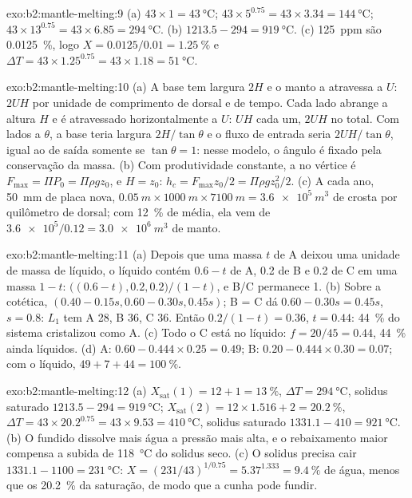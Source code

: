 \begin{solution}{exo:b2:mantle-melting:9}
(a) $43\times1 = \qty{43}{\celsius}$; $43\times5^{0.75} = 43\times3.34 =
\qty{144}{\celsius}$; $43\times13^{0.75} = 43\times6.85 = \qty{294}{\celsius}$.
(b) $1213.5 - 294 = \qty{919}{\celsius}$. (c) \qty{125}{ppm} são
\qty{0.0125}{\percent}, logo $X = 0.0125/0.01 = \qty{1.25}{\percent}$ e $\Delta T =
43\times1.25^{0.75} = 43\times1.18 = \qty{51}{\celsius}$.
\end{solution}

\begin{solution}{exo:b2:mantle-melting:10}
(a) A base tem largura $2H$ e o manto a atravessa a $U$: $2UH$ por unidade de comprimento
de dorsal e de tempo. Cada lado abrange a altura $H$ e é atravessado horizontalmente a
$U$: $UH$ cada um, $2UH$ no total. Com lados a $\theta$, a base teria largura
$2H/\tan\theta$ e o fluxo de entrada seria $2UH/\tan\theta$, igual ao de saída somente se
$\tan\theta = 1$: nesse modelo, o ângulo é fixado pela conservação da massa. (b) Com
produtividade constante, a  no vértice é $F_{\max} = \Pi P_0 = \Pi\rho
g z_0$, e $H = z_0$: $h_c = F_{\max}z_0/2 = \Pi\rho g z_0^2/2$. (c) A cada ano,
\qty{50}{mm} de placa nova, $\qty{0.05}{m}\times\qty{1000}{m}\times\qty{7100}{m} =
\qty{3.6e5}{m^3}$ de crosta por quilômetro de dorsal; com \qty{12}{\percent} de  média, ela vem de $\num{3.6e5}/0.12 = \qty{3.0e6}{m^3}$ de manto.
\end{solution}

\begin{solution}{exo:b2:mantle-melting:11}
(a) Depois que uma massa $t$ de A deixou uma unidade de massa de líquido, o líquido contém $0.6 -
t$ de A, 0.2 de B e 0.2 de C em uma massa $1 - t$: $\big((0.6 - t), 0.2,
0.2\big)/(1 - t)$, e B/C permanece 1. (b) Sobre a cotética, $(0.40 - 0.15s, 0.60 -
0.30s, 0.45s)$; B = C dá $0.60 - 0.30s = 0.45s$, $s = 0.8$: $L_1$ tem A 28, B
36, C 36. Então $0.2/(1 - t) = 0.36$, $t = 0.44$: \qty{44}{\percent} do sistema
cristalizou como A. (c) Todo o C está no líquido: $f = 20/45 = 0.44$,
\qty{44}{\percent} ainda líquidos. (d) A: $0.60 - 0.444\times0.25 = 0.49$; B: $0.20 -
0.444\times0.30 = 0.07$; com o líquido, $49 + 7 + 44 = \qty{100}{\percent}$.
\end{solution}

\begin{solution}{exo:b2:mantle-melting:12}
(a) $X_{\mathrm{sat}}(1) = 12 + 1 = \qty{13}{\percent}$, $\Delta T =
\qty{294}{\celsius}$, solidus saturado $1213.5 - 294 = \qty{919}{\celsius}$;
$X_{\mathrm{sat}}(2) = 12\times1.516 + 2 = \qty{20.2}{\percent}$, $\Delta T =
43\times20.2^{0.75} = 43\times9.53 = \qty{410}{\celsius}$, solidus saturado $1331.1
- 410 = \qty{921}{\celsius}$. (b) O fundido dissolve mais água a pressão mais alta,
e o rebaixamento maior compensa a subida de \qty{118}{\celsius} do solidus seco.
(c) O solidus precisa cair $1331.1 - 1100 = \qty{231}{\celsius}$: $X =
(231/43)^{1/0.75} = 5.37^{1.333} = \qty{9.4}{\percent}$ de água, menos que os
\qty{20.2}{\percent} da saturação, de modo que a cunha pode fundir.
\end{solution}

